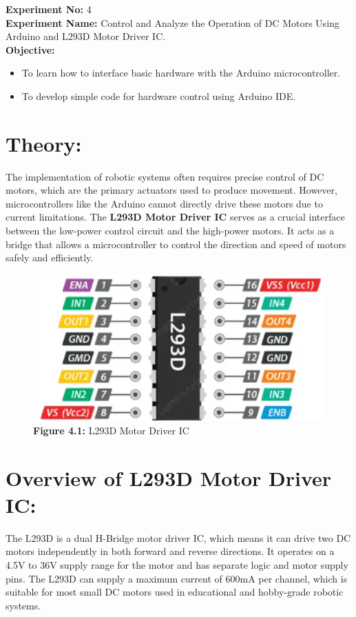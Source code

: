 \documentclass[a4paper,12pt]{article}
\begin{document}
	
	\textbf{Experiment No: }4\\
	\textbf{ Experiment Name:} Control and Analyze the Operation of DC Motors Using Arduino and L293D
	Motor Driver IC. \\

	\textbf{Objective:}
	
	
	\begin{itemize}
		\item To learn how to interface basic hardware with the Arduino microcontroller.
		\item To develop simple code for hardware control using Arduino IDE.
	\end{itemize}
	
	
	

	\section*{Theory:}
	The implementation of robotic systems often requires precise control of DC motors, which are the primary actuators used to produce movement. However, microcontrollers like the Arduino cannot directly drive these motors due to current limitations. The \textbf{L293D Motor Driver IC} serves as a crucial interface between the low-power control circuit and the high-power motors. It acts as a bridge that allows a microcontroller to control the direction and speed of motors safely and efficiently.
	
	\begin{figure}[H]
		\centering
			\includegraphics[width=0.5\linewidth]{"Images/2"}
		\caption*{\textbf{Figure 4.1:} L293D Motor Driver IC}
	\end{figure}
	
	\section*{Overview of L293D Motor Driver IC:}
	The L293D is a dual H-Bridge motor driver IC, which means it can drive two DC motors independently in both forward and reverse directions. It operates on a 4.5V to 36V supply range for the motor and has separate logic and motor supply pins. The L293D can supply a maximum current of 600mA per channel, which is suitable for most small DC motors used in educational and hobby-grade robotic systems.
	
\end{document}
